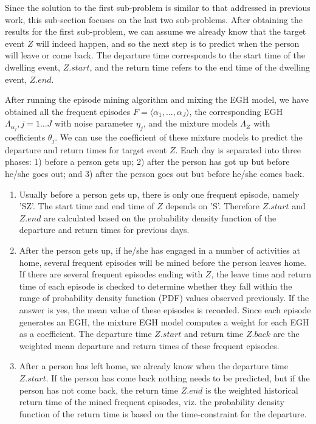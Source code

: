 Since the solution to the first sub-problem is similar to 
that addressed in previous work, 
this sub-section focuses on the last two sub-problems. 
After obtaining the results for the first sub-problem, 
we can assume we already know that the target event $Z$ will indeed happen, 
and so the next step is to predict when the person will leave or come back. 
The departure time corresponds to the start time of the dwelling event, $Z.start$, and 
the return time refers to the end time of the dwelling event, $Z.end$. 

After running the episode mining algorithm and mixing the EGH model, 
we have obtained all the frequent episodes $F=\langle \alpha_1,..., \alpha_J \rangle$, 
the corresponding EGH $\Lambda_{\alpha_j}, j=1...J$ with noise parameter $\eta_j$, 
and the mixture models $\Lambda_Z$ with coefficients $\theta_j$.
We can use the coefficient of these mixture models to predict the departure and return times for
target event $Z$. 
 Each day is separated into three phases: 1) before a person gets up; 
2) after the person has got up but before he/she goes out;
and 3) after the person goes out but before he/she comes back. 
\begin{enumerate}
\item
Usually before a person gets up, there is only one frequent episode, namely 'SZ'. 
The start time and end time of $Z$ depends on 'S'. 
Therefore $Z.start$ and $Z.end$  are calculated based on the probability density function of 
the departure and return times for previous days. 
\item
After the person gets up, if he/she has engaged in a number of activities at home, 
several frequent episodes will be mined before the person leaves home. 
If there are several frequent episodes ending with $Z$,  
the leave time and return time of each episode is checked to determine
whether they fall within the range of probability density function (PDF) values observed previously. 
If the answer is yes, the mean value of these episodes is recorded. 
Since each episode generates an EGH, 
the mixture EGH model computes a weight for each EGH as a coefficient. 
The departure time $Z.start$ and return time $Z.back$ are 
the weighted mean departure and return times of these frequent episodes. 
\item
After a person has left home, 
we already know when the departure time $Z.start$. 
If the person has come back
nothing needs to be predicted, but 
if the person has not come back,  
the return time $Z.end$ is the weighted 
 historical return time of the mined 
frequent episodes, 
viz. the probability density function of the return time is based on the 
time-constraint for the departure.
\end{enumerate}

